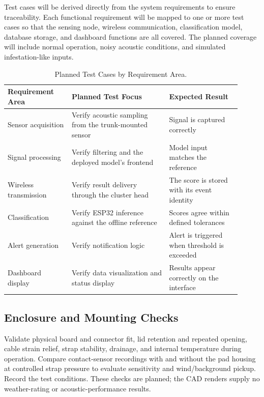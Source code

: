 \documentclass[12pt,a4paper,oneside]{memoir}
\newcommand{\newrevision}[1]{#1}
\begin{document}
Test cases will be derived directly from the system requirements to ensure traceability. Each functional requirement will be mapped to one or more test cases so that the sensing node, wireless communication, classification model, database storage, and dashboard functions are all covered. The planned coverage will include normal operation, noisy acoustic conditions, and simulated infestation-like inputs.

\begin{table}[h]
\centering
\caption{Planned Test Cases by Requirement Area.}
\label{tab:testcases}
\renewcommand{\arraystretch}{1.3}
\begin{tabular}{@{} p{0.25\linewidth} p{0.38\linewidth} p{0.28\linewidth} @{}}
\toprule
\textbf{Requirement Area} & \textbf{Planned Test Focus} & \textbf{Expected Result} \\
\midrule
Sensor acquisition    & Verify acoustic sampling from the trunk-mounted sensor & Signal is captured correctly \\
\newrevision{Signal processing} & \newrevision{Verify filtering and the deployed model's frontend} & \newrevision{Model input matches the reference} \\
\newrevision{Wireless transmission} & \newrevision{Verify result delivery through the cluster head} & \newrevision{The score is stored with its event identity} \\
\newrevision{Classification} & \newrevision{Verify ESP32 inference against the offline reference} & \newrevision{Scores agree within defined tolerances} \\
Alert generation      & Verify notification logic                              & Alert is triggered when threshold is exceeded \\
Dashboard display     & Verify data visualization and status display           & Results appear correctly on the interface \\
\bottomrule
\end{tabular}
\end{table}

\FloatBarrier

\subsection{\newrevision{Enclosure and Mounting Checks}}
\newrevision{Validate physical board and connector fit, lid retention and repeated opening, cable strain relief, strap stability, drainage, and internal temperature during operation. Compare contact-sensor recordings with and without the pad housing at controlled strap pressure to evaluate sensitivity and wind/background pickup. Record the test conditions. These checks are planned; the CAD renders supply no weather-rating or acoustic-performance results.}
\end{document}

